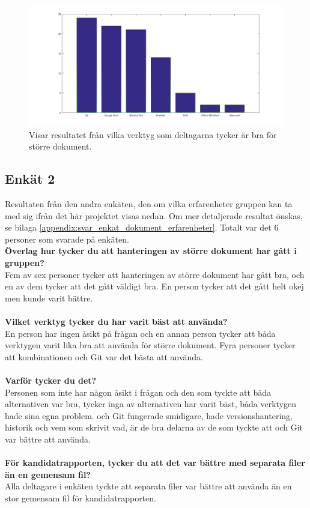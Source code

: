 \begin{figure}[H]	
	\includegraphics[width=150mm]{figures/best_document_tool.png}
	\centering
	\caption{Visar resultatet från vilka verktyg som deltagarna tycker är bra för större dokument.}
	\label{fig:best_document_tool}
\end{figure}

\subsection{Enkät 2}
Resultaten från den andra enkäten, den om vilka erfarenheter gruppen kan ta med sig ifrån det här projektet visas nedan. Om mer detaljerade resultat önskas, se bilaga \ref{appendix:svar_enkat_dokument_erfarenheter}. Totalt var det 6 personer som svarade på enkäten.\\
\textbf{Överlag hur tycker du att hanteringen av större dokument har gått i gruppen?}\\
Fem av sex personer tycker att hanteringen av större dokument har gått bra, och en av dem tycker att det gått väldigt bra. En person tycker att det gått helt okej men kunde varit bättre.\\\\
\textbf{Vilket verktyg tycker du har varit bäst att använda?}\\
En person har ingen åsikt på frågan och en annan person tycker att båda verktygen varit lika bra att använda för större dokument. Fyra personer tycker att kombinationen \latex och Git var det bästa att använda.\\\\
\textbf{Varför tycker du det?}\\
Personen som inte har någon åsikt i frågan och den som tyckte att båda alternativen var bra, tycker inga av alternativen har varit bäst, båda verktygen hade sina egna problem. \latex och Git fungerade smidigare, hade versionshantering, historik och vem som skrivit vad, är de bra delarna av de som tyckte att \latex och Git var bättre att använda.\\\\
\textbf{För kandidatrapporten, tycker du att det var bättre med separata filer än en gemensam fil?}\\
Alla deltagare i enkäten tyckte att separata filer var bättre att använda än en stor gemensam fil för kandidatrapporten.

